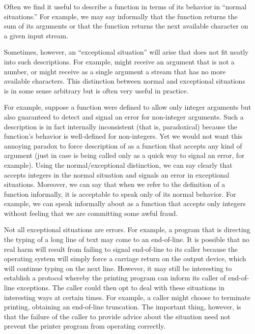 Often we find it useful to describe a function in terms of its behavior in
``normal situations.'' For example, we may say informally that the function
\cdf{+} returns the sum of its arguments or that the function
 returns the next available character on a given input
stream.

Sometimes, however, an ``exceptional situation'' will arise that does not fit
neatly into such descriptions. For example, \cdf{+} might receive an argument
that is not a number, or  might receive as a single argument
a stream that has no more available characters.  This distinction between normal
and exceptional situations is in some sense arbitrary but is often very
useful in practice.

For example, suppose a function  were defined to allow only
integer arguments but also guaranteed to
detect and signal an error for non-integer arguments.
Such a description is in fact internally inconsistent (that is,
paradoxical) because the function's behavior is well-defined for non-integers.
Yet we would not want this annoying paradox to force description of 
as a function that accepts any kind of argument (just in case 
is being called only as a quick way to signal an error, for example).
Using the normal/exceptional distinction, we can say clearly that  accepts integers
in the normal situation and signals an error in exceptional situations.
Moreover, we can say that when we refer to the definition of a
function informally, it is acceptable to speak only of its normal behavior.
For example, we can speak informally about  as a function that accepts only
integers without feeling that we are committing some awful fraud.

Not all exceptional situations are errors.  For example, a program that is
directing the typing of a long line of text may come to an end-of-line.
It is possible that no real harm will result from failing to signal end-of-line
to its caller because the operating system will simply force a carriage
return on the output device, which will continue typing on the next line. However, it
may still be interesting to establish a protocol whereby the printing program can
inform its caller of end-of-line exceptions. The caller could
then opt to deal with these situations in interesting ways at certain times.
For example, a caller might choose to terminate printing, obtaining an end-of-line
truncation. The important thing, however, is that the failure of the
caller to provide advice about the situation need not prevent
the printer program from operating correctly.

